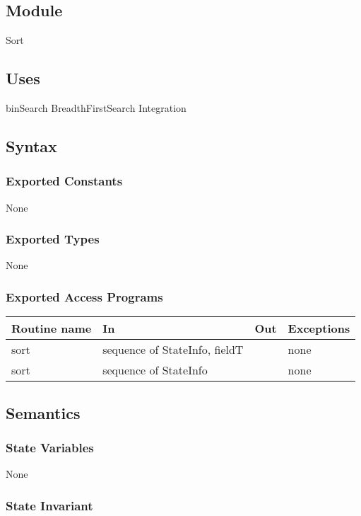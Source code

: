 \documentclass[12pt]{article}
\begin{document}
\subsection*{Module}

Sort

\subsection* {Uses}

binSearch
BreadthFirstSearch
Integration

\subsection* {Syntax}

\subsubsection* {Exported Constants}

None

\subsubsection* {Exported Types}

None

\subsubsection* {Exported Access Programs}

\begin{tabular}{| l | l | l | p{5cm} |}
\hline
\textbf{Routine name} & \textbf{In} & \textbf{Out} & \textbf{Exceptions}\\
\hline
sort & sequence of StateInfo, fieldT &  & none\\
\hline
sort &  sequence of StateInfo & & none\\
\hline
\end{tabular}

\subsection* {Semantics}

\subsubsection* {State Variables}
None

\subsubsection* {State Invariant}
\end{document}
